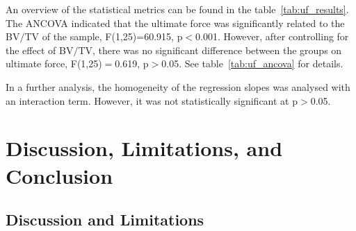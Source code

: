 \documentclass[12pt, a4paper, twoside]{report}
\begin{document}
%
\begin{table}[H]
\centering
{}
\caption{Results from the ANCOVA analysis, controlling for BV/TV.}
\label{tab:uf_ancova}
\end{table}
%
%
An overview of the statistical metrics can be found in the table~\ref{tab:uf_results}.
The ANCOVA indicated that the ultimate force was significantly related to the BV$/$TV of the sample, F(1,25)=60.915, p$<$0.001.
However, after controlling for the effect of BV$/$TV, there was no significant difference between the groups on ultimate force, F(1,25)$=$0.619, p$>$0.05.
See table~\ref{tab:uf_ancova} for details.

In a further analysis, the homogeneity of the regression slopes was analysed with an interaction term.
However, it was not statistically significant at p$>$0.05.

%
%
%
\newpage
%
%
%
\chapter{Discussion, Limitations, and Conclusion}
%
%
%
\section{Discussion and Limitations}
\end{document}
